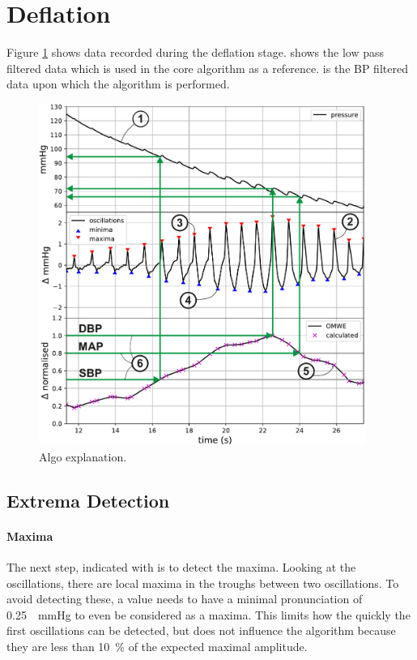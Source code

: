 \section{Deflation}\label{sec:Deflation}
Figure \ref{fig:algoExplain} shows data recorded during the deflation stage.  shows the low pass filtered data which is used in the core algorithm as a reference.  is the BP filtered data upon which the algorithm is performed. 

\begin{figure}[ht]
\centering
\includegraphics[width=0.95\textwidth]{figures/algorithm_example_annotated.pdf}
\caption{Algo explanation.}
\label{fig:algoExplain}
\end{figure}



\subsection{Extrema Detection}
\paragraph{Maxima}The next step, indicated with  is to detect the maxima. Looking at the oscillations, there are local maxima in the troughs between two oscillations. To avoid detecting these, a value needs to have a minimal pronunciation of \SI{0.25}{\Delta\mmHg} to even be considered as a maxima. This limits how the quickly the first oscillations can be detected, but does not influence the algorithm because they are less than \SI{10}{\percent} of the expected maximal amplitude.

